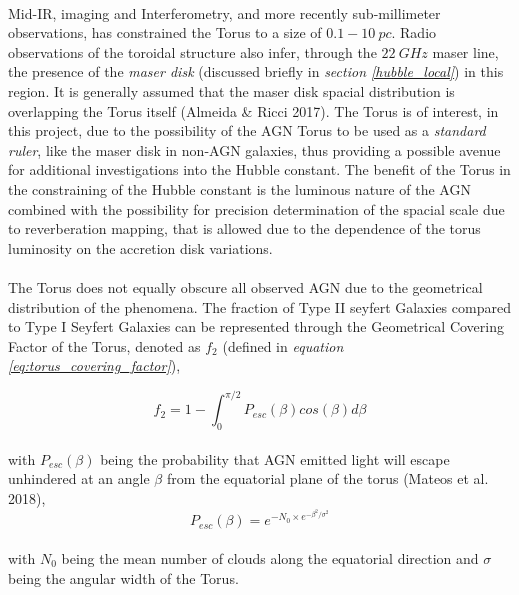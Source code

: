 \documentclass[a4paper, 12pt, twoside]{article}
\begin{document}
\\
Mid-IR, imaging and Interferometry, and more recently sub-millimeter observations, has constrained the Torus to a size of $0.1-10\ pc$. Radio observations of the toroidal structure also infer, through the $22\ GHz$ maser line, the presence of the \emph{maser disk} (discussed briefly in \emph{section \ref{hubble_local}}) in this region. It is generally assumed that the maser disk spacial distribution is overlapping the Torus itself (Almeida \& Ricci 2017\cite{Almeida2017}). The Torus is of interest, in this project, due to the possibility of the AGN Torus to be used as a \emph{standard ruler}, like the maser disk in non-AGN galaxies, thus providing a possible avenue for additional investigations into the Hubble constant. The benefit of the Torus in the constraining of the Hubble constant is the luminous nature of the AGN combined with the possibility for precision determination of the spacial scale due to reverberation mapping, that is allowed due to the dependence of the torus luminosity on the accretion disk variations. \\
\\
The Torus does not equally obscure all observed AGN due to the geometrical distribution of the phenomena. The fraction of Type II seyfert Galaxies compared to Type I Seyfert Galaxies can be represented through the Geometrical Covering Factor of the Torus, denoted as $f_{2}$ (defined in \emph{equation \ref{eq:torus_covering_factor}}),

\begin{equation}
f_2 = 1 - \int_{0}^{\pi/2}P_{esc}(\beta)cos(\beta)d\beta
\label{eq:torus_covering_factor}
\end{equation}\\
with $P_{esc}(\beta)$ being the probability that AGN emitted light will escape unhindered at an angle $\beta$ from the equatorial plane of the torus (Mateos et al. 2018),
\begin{equation}
P_{esc}(\beta) = e^{-N_{0} \times e^{-\beta^{2}/\sigma^{2}}}
\label{eq:P_covering_factor}
\end{equation}\\
with $N_{0}$ being the mean number of clouds along the equatorial direction and $\sigma$ being the angular width of the Torus. 

\end{document}
